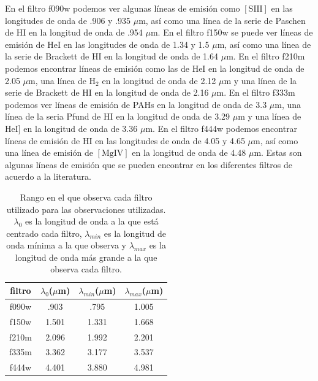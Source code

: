 \documentclass{book}
\begin{document}
En el filtro f090w podemos ver algunas líneas de emisión como $[\mathrm{S \scriptstyle{III}}]$ en las longitudes de onda de .906 y .935 $\mu$m, así como una línea de la serie de Paschen de $\mathrm{H\scriptstyle{I}}$ en la longitud de onda de .954 $\mu$m. En el filtro f150w se puede ver líneas de emisión de $\mathrm{He\scriptstyle{I}}$ en las longitudes de onda de 1.34 y 1.5 $\mu$m, así como una línea de la serie de Brackett de $\mathrm{H\scriptstyle{I}}$ en la longitud de onda de 1.64 $\mu$m. En el filtro f210m podemos encontrar líneas de emisión como las de $\mathrm{He\scriptstyle{I}}$ en la longitud de onda de 2.05 $\mu$m, una línea de $\mathrm{H_2}$ en la longitud de onda de  2.12 $\mu$m y una línea de la serie de Brackett de $\mathrm{H\scriptstyle{I}}$ en la longitud de onda de 2.16 $\mu$m. En el filtro f333m podemos ver líneas de emisión de PAHs en la longitud de onda de 3.3 $\mu$m, una línea de la seria Pfund de $\mathrm{H\scriptstyle{I}}$ en la longitud de onda de 3.29 $\mu$m y una línea de $\mathrm{He\scriptstyle{I}}]$ en la longitud de onda de 3.36 $\mu$m. En el filtro f444w podemos encontrar líneas de emisión de $\mathrm{H\scriptstyle{I}}$ en las longitudes de onda de 4.05 y 4.65 $\mu$m, así como una línea de emisión de $[\mathrm{Mg\scriptstyle{IV}}]$ en la longitud de onda de 4.48 $\mu$m. Estas son algunas líneas de emisión que se pueden encontrar en los diferentes filtros de acuerdo a la literatura. 

\begin{table}[htb]
    \centering
    \begin{tabular}{c c c c}
        \toprule
        filtro & $\lambda_0$($\mu$m) & $\lambda_{min}$($\mu$m) & $\lambda_{max}$($\mu$m) \\ 
        \midrule
         f090w & .903 & .795 & 1.005\\
         f150w &1.501 &1.331 & 1.668\\
         f210m &2.096 &1.992 & 2.201\\
         f335m &3.362 &3.177 & 3.537\\
         f444w &4.401 &3.880 & 4.981\\
         \bottomrule
    \end{tabular}
    \caption{Rango en el que observa cada filtro utilizado para las observaciones utilizadas. $\lambda_0$ es la longitud de onda a la que está centrado cada filtro, $\lambda_{min}$ es la longitud de onda mínima a la que observa y $\lambda
    _{max}$ es la longitud de onda más grande a la que observa cada filtro.}
    \label{tab:filtros}
\end{table}
\end{document}
